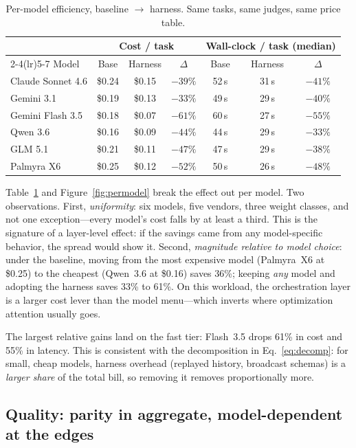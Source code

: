 \documentclass[11pt]{article}
\newcommand{\CostRange}{33\% to 61\%}
\begin{document}
\begin{table}[t]
\centering\small
\caption{Per-model efficiency, baseline $\rightarrow$ harness. Same tasks, same judges, same price table.}
\label{tab:permodel}
\begin{tabular}{@{}lcccccc@{}}
\toprule
 & \multicolumn{3}{c}{Cost / task} & \multicolumn{3}{c}{Wall-clock / task (median)} \\
\cmidrule(lr){2-4}\cmidrule(lr){5-7}
Model & Base & Harness & $\Delta$ & Base & Harness & $\Delta$ \\
\midrule
Claude Sonnet 4.6 & \$0.24 & \$0.15 & $-39\%$ & 52\,s & 31\,s & $-41\%$ \\
Gemini 3.1        & \$0.19 & \$0.13 & $-33\%$ & 49\,s & 29\,s & $-40\%$ \\
Gemini Flash 3.5  & \$0.18 & \$0.07 & $-61\%$ & 60\,s & 27\,s & $-55\%$ \\
Qwen 3.6          & \$0.16 & \$0.09 & $-44\%$ & 44\,s & 29\,s & $-33\%$ \\
GLM 5.1           & \$0.21 & \$0.11 & $-47\%$ & 47\,s & 29\,s & $-38\%$ \\
Palmyra X6        & \$0.25 & \$0.12 & $-52\%$ & 50\,s & 26\,s & $-48\%$ \\
\bottomrule
\end{tabular}
\end{table}

Table~\ref{tab:permodel} and Figure~\ref{fig:permodel} break the effect out per model. Two observations. First, \emph{uniformity}: six models, five vendors, three weight classes, and not one exception---every model's cost falls by at least a third. This is the signature of a layer-level effect: if the savings came from any model-specific behavior, the spread would show it. Second, \emph{magnitude relative to model choice}: under the baseline, moving from the most expensive model (Palmyra~X6 at \$0.25) to the cheapest (Qwen~3.6 at \$0.16) saves 36\%; keeping \emph{any} model and adopting the harness saves \CostRange{}. On this workload, the orchestration layer is a larger cost lever than the model menu---which inverts where optimization attention usually goes.

The largest relative gains land on the fast tier: Flash~3.5 drops 61\% in cost and 55\% in latency. This is consistent with the decomposition in Eq.~\eqref{eq:decomp}: for small, cheap models, harness overhead (replayed history, broadcast schemas) is a \emph{larger share} of the total bill, so removing it removes proportionally more.

\subsection{Quality: parity in aggregate, model-dependent at the edges}
\label{sec:quality}
\end{document}
